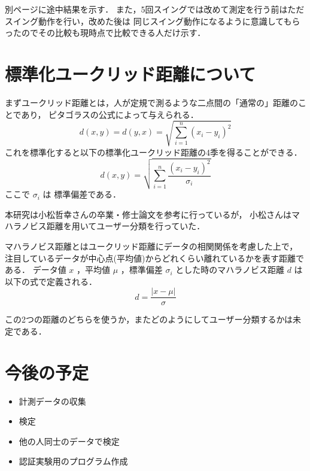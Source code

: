 別ページに途中結果を示す．
また，5回スイングでは改めて測定を行う前はただスイング動作を行い，改めた後は
同じスイング動作になるように意識してもらったのでその比較も現時点で比較できる人だけ示す．

\section{標準化ユークリッド距離について}

まずユークリッド距離とは，人が定規で測るような二点間の「通常の」距離のことであり，
ピタゴラスの公式によって与えられる．
\begin{equation}
    d(x, y) = d(y, x) = \sqrt{\sum_{i=1}^{n}(x_i - y_i)^2}
\end{equation}
これを標準化すると以下の標準化ユークリッド距離の4季を得ることができる．
\begin{equation}
    d(x, y) = \sqrt{\sum_{i=1}^{n}\frac{(x_i - y_i)^2}{\sigma_i}}
\end{equation}
ここで $\sigma_i$ は 標準偏差である．

本研究は小松哲幸さんの卒業・修士論文を参考に行っているが，
小松さんはマハラノビス距離を用いてユーザー分類を行っていた．

マハラノビス距離とはユークリッド距離にデータの相関関係を考慮した上で，
注目しているデータが中心点(平均値)からどれくらい離れているかを表す距離である．
データ値 $x$ ，平均値 $\mu$ ，標準偏差 $\sigma_i$ とした時のマハラノビス距離 $d$ は
以下の式で定義される．
\begin{equation}
    d = \frac{| x - \mu |}{\sigma}
\end{equation}

この2つの距離のどちらを使うか，またどのようにしてユーザー分類するかは未定である．

\section{今後の予定}
    \begin{itemize}
        \item 計測データの収集
        \item 検定
        \item 他の人同士のデータで検定
        \item 認証実験用のプログラム作成
    \end{itemize}

